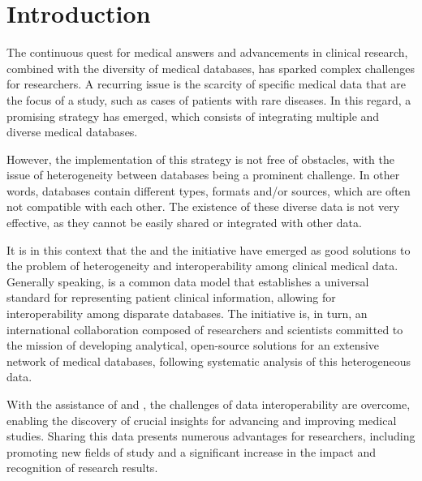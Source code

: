 \chapter{Introduction}
\label{chapter:Introduction}

%
% 
%


The continuous quest for medical answers and advancements in clinical research, combined with the diversity of medical databases, has sparked complex challenges for researchers. A recurring issue is the scarcity of specific medical data that are the focus of a study, such as cases of patients with rare diseases. In this regard, a promising strategy has emerged, which consists of integrating multiple and diverse medical databases.

However, the implementation of this strategy is not free of obstacles, with the issue of heterogeneity between databases being a prominent challenge. In other words, databases contain different types, formats and/or sources, which are often not compatible with each other. The existence of these diverse data is not very effective, as they cannot be easily shared or integrated with other data.

It is in this context that the {\omop} and the {\ohdsi} initiative have emerged as good solutions to the problem of heterogeneity and interoperability among clinical medical data. Generally speaking, {\omop} is a common data model that establishes a universal standard for representing patient clinical information, allowing for interoperability among disparate databases. The {\ohdsi} initiative is, in turn, an international collaboration composed of researchers and scientists committed to the mission of developing analytical, open-source solutions for an extensive network of medical databases, following systematic analysis of this heterogeneous data.

With the assistance of {\omop} and {\ohdsi}, the challenges of data interoperability are overcome, enabling the discovery of crucial insights for advancing and improving medical studies. Sharing this data presents numerous advantages for researchers, including promoting new fields of study and a significant increase in the impact and recognition of research results.


